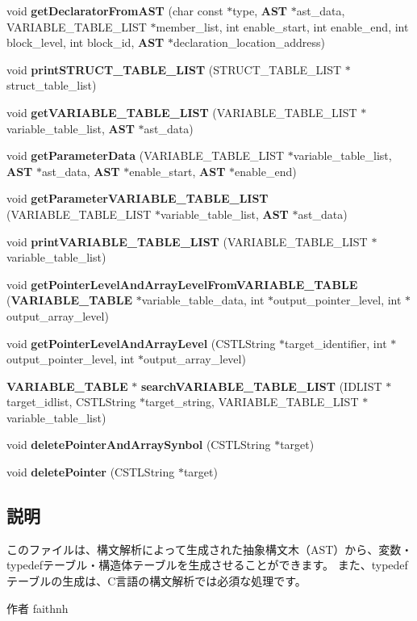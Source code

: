 \begin{DoxyCompactItemize}
\item 
void {\bf getDeclaratorFromAST} (char const $\ast$type, {\bf AST} $\ast$ast\_\-data, VARIABLE\_\-TABLE\_\-LIST $\ast$member\_\-list, int enable\_\-start, int enable\_\-end, int block\_\-level, int block\_\-id, {\bf AST} $\ast$declaration\_\-location\_\-address)
\item 
void {\bf printSTRUCT\_\-TABLE\_\-LIST} (STRUCT\_\-TABLE\_\-LIST $\ast$struct\_\-table\_\-list)
\item 
void {\bf getVARIABLE\_\-TABLE\_\-LIST} (VARIABLE\_\-TABLE\_\-LIST $\ast$variable\_\-table\_\-list, {\bf AST} $\ast$ast\_\-data)
\item 
void {\bf getParameterData} (VARIABLE\_\-TABLE\_\-LIST $\ast$variable\_\-table\_\-list, {\bf AST} $\ast$ast\_\-data, {\bf AST} $\ast$enable\_\-start, {\bf AST} $\ast$enable\_\-end)
\item 
void {\bf getParameterVARIABLE\_\-TABLE\_\-LIST} (VARIABLE\_\-TABLE\_\-LIST $\ast$variable\_\-table\_\-list, {\bf AST} $\ast$ast\_\-data)
\item 
void {\bf printVARIABLE\_\-TABLE\_\-LIST} (VARIABLE\_\-TABLE\_\-LIST $\ast$variable\_\-table\_\-list)
\item 
void {\bf getPointerLevelAndArrayLevelFromVARIABLE\_\-TABLE} ({\bf VARIABLE\_\-TABLE} $\ast$variable\_\-table\_\-data, int $\ast$output\_\-pointer\_\-level, int $\ast$output\_\-array\_\-level)
\item 
void {\bf getPointerLevelAndArrayLevel} (CSTLString $\ast$target\_\-identifier, int $\ast$output\_\-pointer\_\-level, int $\ast$output\_\-array\_\-level)
\item 
{\bf VARIABLE\_\-TABLE} $\ast$ {\bf searchVARIABLE\_\-TABLE\_\-LIST} (IDLIST $\ast$target\_\-idlist, CSTLString $\ast$target\_\-string, VARIABLE\_\-TABLE\_\-LIST $\ast$variable\_\-table\_\-list)
\item 
void {\bf deletePointerAndArraySynbol} (CSTLString $\ast$target)
\item 
void {\bf deletePointer} (CSTLString $\ast$target)
\end{DoxyCompactItemize}


\subsection{説明}
このファイルは、構文解析によって生成された抽象構文木（AST）から、変数・typedefテーブル・構造体テーブルを生成させることができます。 また、typedefテーブルの生成は、C言語の構文解析では必須な処理です。 \begin{DoxyAuthor}{作者}
faithnh 
\end{DoxyAuthor}


